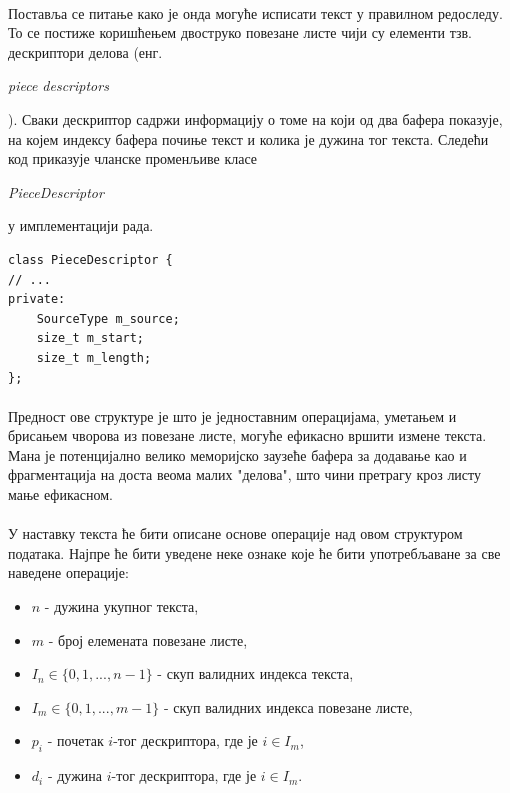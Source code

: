 \documentclass[12pt,oneside]{memoir}
\begin{document}
\paragraph{}
Поставља се питање како је онда могуће исписати текст у правилном редоследу. То се постиже
коришћењем двоструко повезане листе чији су елементи тзв. дескриптори делова (енг. \begin{latinica}\textit{piece descriptors}\end{latinica}).
Сваки дескриптор садржи информацију о томе на који од
два бафера показује, на којем индексу бафера почиње текст и колика је дужина тог текста. 
Следећи код приказује чланске променљиве класе \begin{latinica}\textit{PieceDescriptor}\end{latinica} у имплементацији рада.

\begin{verbatim}
class PieceDescriptor {
// ...
private:
    SourceType m_source;
    size_t m_start;
    size_t m_length;
};
\end{verbatim}

\paragraph{}
Предност ове структуре је што је једноставним операцијама, уметањем и брисањем чворова из
повезане листе, могуће ефикасно вршити измене текста. Мана је потенцијално велико меморијско заузеће
бафера за додавање као и фрагментација на доста веома малих "делова", што чини претрагу
кроз листу мање ефикасном.

\paragraph{}
У наставку текста ће бити описане основе операције над овом структуром података. Најпре
ће бити уведене неке ознаке које ће бити употребљаване за све наведене операције:

\begin{itemize}
	\item \(n\) - дужина укупног текста,
	\item \(m\) - број елемената повезане листе,
	\item \(I_n \in \{0, 1,...,n-1\}\) - скуп валидних индекса текста,
	\item \(I_m \in \{0, 1,...,m-1\}\) - скуп валидних индекса повезане листе,
	\item \(p_i\) - почетак \(i\)-тог дескриптора, где је \(i \in I_m\),
	\item \(d_i\) - дужина \(i\)-тог дескриптора, где је \(i \in I_m\).
\end{itemize}
\end{document}
